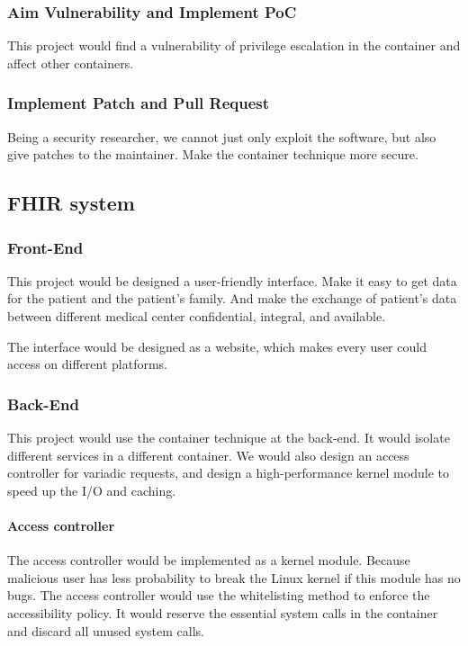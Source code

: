 \documentclass[12pt,a4paper]{article}
\begin{document}
\subsubsection{Aim Vulnerability and Implement PoC}
This project would find a vulnerability of privilege escalation in the container and affect
other containers.

\subsubsection{Implement Patch and Pull Request}
Being a security researcher, we cannot just only exploit the software, but also give patches to
the maintainer. Make the container technique more secure.

\subsection{FHIR system}
\subsubsection{Front-End}
This project would be designed a user-friendly interface. Make it easy to get data for the
patient and the patient's family. And make the exchange of patient's data between different
medical center confidential, integral, and available.

The interface would be designed as a website, which makes every user could access on different
platforms.

\subsubsection{Back-End}
This project would use the container technique at the back-end. It would isolate different
services in a different container. We would also design an access controller for variadic
requests, and design a high-performance kernel module to speed up the I/O and caching.

\paragraph{Access controller}
The access controller would be implemented as a kernel module. Because malicious user has less
probability to break the Linux kernel if this module has no bugs.
The access controller would use the whitelisting method to enforce the accessibility policy.
It would reserve the essential system calls in the container and discard all unused system calls.
\end{document}
